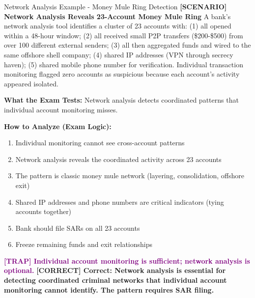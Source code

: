 \documentclass[11pt,a4paper]{beamer}
\newcommand{\trap}[1]{\textcolor{purple}{\textbf{[TRAP] #1}}}
\newcommand{\correct}[1]{\textcolor{green!50!black}{\textbf{[CORRECT] #1}}}
\newcommand{\scenario}[1]{\textcolor{blue!70!black}{\textbf{[SCENARIO] #1}}}
\begin{document}
	\begin{frame}{Network Analysis Example - Money Mule Ring Detection}
		\scenario{Network Analysis Reveals 23-Account Money Mule Ring}
		A bank's network analysis tool identifies a cluster of 23 accounts with: (1) all opened within a 48-hour window; (2) all received small P2P transfers (\$200-\$500) from over 100 different external senders; (3) all then aggregated funds and wired to the same offshore shell company; (4) shared IP addresses (VPN through secrecy haven); (5) shared mobile phone number for verification. Individual transaction monitoring flagged zero accounts as suspicious because each account's activity appeared isolated.
		
		\textbf{What the Exam Tests:} Network analysis detects coordinated patterns that individual account monitoring misses.
		
		\textbf{How to Analyze (Exam Logic):}
		\begin{enumerate}
			\item Individual monitoring cannot see cross-account patterns
			\item Network analysis reveals the coordinated activity across 23 accounts
			\item The pattern is classic money mule network (layering, consolidation, offshore exit)
			\item Shared IP addresses and phone numbers are critical indicators (tying accounts together)
			\item Bank should file SARs on all 23 accounts
			\item Freeze remaining funds and exit relationships
		\end{enumerate}
		
		\trap{Individual account monitoring is sufficient; network analysis is optional.}
		\correct{Correct: Network analysis is essential for detecting coordinated criminal networks that individual account monitoring cannot identify. The pattern requires SAR filing.}
	\end{frame}
	
\end{document}
